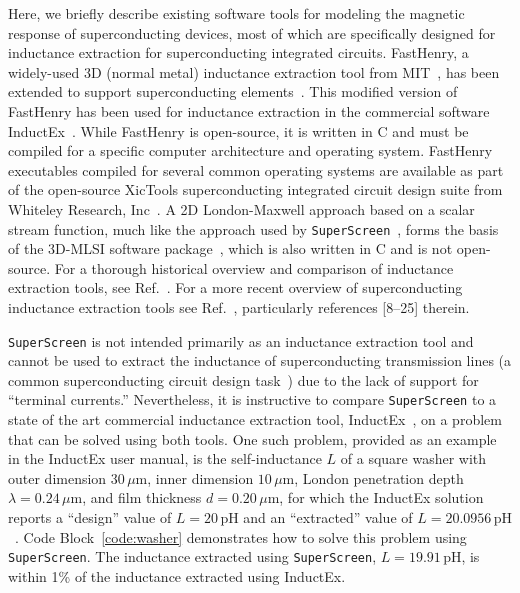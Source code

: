 \documentclass[final,3p,times,twocolumn]{elsarticle}
\newcommand{\inline}[1]{\texttt{#1}\xspace}
\newcommand{\SuperScreen}{\inline{SuperScreen}}
\newcommand{\um}{\mu\mathrm{m}}
\begin{document}
Here, we briefly describe existing software tools for modeling the magnetic response of superconducting devices, most of which are specifically designed for inductance extraction for superconducting integrated circuits. FastHenry, a widely-used 3D (normal metal) inductance extraction tool from MIT~\cite{Kamon1994-ck}, has been extended to support superconducting elements~\cite{wrcad, XicTools}. This modified version of FastHenry has been used for inductance extraction in the commercial software InductEx~\cite{Fourie2011-wl, Fourie2012-gv, Jackman2016-mf}. While FastHenry is open-source, it is written in C and must be compiled for a specific computer architecture and operating system. FastHenry executables compiled for several common operating systems are available as part of the open-source XicTools superconducting integrated circuit design suite from Whiteley Research, Inc~\cite{wrcad, XicTools}. A 2D London-Maxwell approach based on a scalar stream function, much like the approach used by \SuperScreen~\cite{Brandt2004-ew, Brandt2005-wj}, forms the basis of the 3D-MLSI software package~\cite{Khapaev1997-kw, Khapaev2001-xq, Khapaev2001-pw, Khapaev2002-ev}, which is also written in C and is not open-source. For a thorough historical overview and comparison of inductance extraction tools, see Ref.~\cite{Gaj1999-ls}. For a more recent overview of superconducting inductance extraction tools see Ref.~\cite{Tolpygo2021-jz}, particularly references [8--25] therein.

\SuperScreen is not intended primarily as an inductance extraction tool and cannot be used to extract the inductance of superconducting transmission lines (a common superconducting circuit design task~\cite{Gaj1999-ls,Khapaev1996-uu,Tolpygo2021-jz}) due to the lack of support for ``terminal currents.'' Nevertheless, it is instructive to compare \SuperScreen to a state of the art commercial inductance extraction tool, InductEx~\cite{Fourie2011-wl, Fourie2012-gv, Jackman2016-mf}, on a problem that can be solved using both tools. One such problem, provided as an example in the InductEx user manual, is the self-inductance $L$ of a square washer with outer dimension $30\,\um$, inner dimension $10\,\um$, London penetration depth $\lambda=0.24\,\um$, and film thickness $d=0.20\,\um$, for which the InductEx solution reports a ``design'' value of $L=20\,\mathrm{pH}$ and an ``extracted'' value of $L=20.0956\,\mathrm{pH}$~\cite{inductex_user_manual_2020}. Code Block~\ref{code:washer} demonstrates how to solve this problem using \SuperScreen. The inductance extracted using \SuperScreen, $L=19.91\,\mathrm{pH}$, is within 1\% of the inductance extracted using InductEx.
\end{document}
